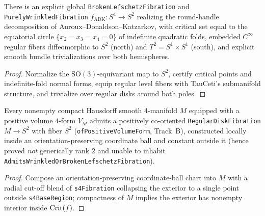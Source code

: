 \begin{theorem}
\label{thm_adk_s4}
\leanok
{}
There is an explicit global \texttt{BrokenLefschetzFibration} and
\texttt{PurelyWrinkledFibration} $f_{\mathrm{ADK}}\colon S^4\to S^2$ realizing the round-handle
decomposition of Auroux--Donaldson--Katzarkov, with critical set equal to the equatorial circle
$\{x_2=x_3=x_4=0\}$ of indefinite quadratic folds, embedded $C^\infty$ regular fibers
diffeomorphic to $S^2$ (north) and $T^2=S^1\times S^1$ (south), and explicit smooth bundle
trivializations over both hemispheres.
\end{theorem}
\begin{proof}\leanok
Normalize the $\mathrm{SO}(3)$-equivariant map to $S^2$, certify critical points and indefinite-fold
normal forms, equip regular level fibers with TauCeti's submanifold structure, and trivialize over
regular disks around both poles.
\end{proof}

\begin{theorem}
\label{ext_fibration_existence}
\leanok
{}
Every nonempty compact Hausdorff smooth $4$-manifold $M$ equipped with a positive volume $4$-form
$V_M$ admits a positively co-oriented \texttt{RegularDiskFibration} $M\to S^2$ with fiber $S^2$
(\texttt{ofPositiveVolumeForm}, Track~B), constructed locally inside an orientation-preserving
coordinate ball and constant outside it (hence proved \emph{not} generically rank $2$ and unable to
inhabit \texttt{AdmitsWrinkledOrBrokenLefschetzFibration}).
\end{theorem}
\begin{proof}\leanok
Compose an orientation-preserving coordinate-ball chart into $M$ with a radial cut-off blend of
\texttt{s4Fibration} collapsing the exterior to a single point outside \texttt{s4BaseRegion};
compactness of $M$ implies the exterior has nonempty interior inside $\mathrm{Crit}(f)$.
\end{proof}

